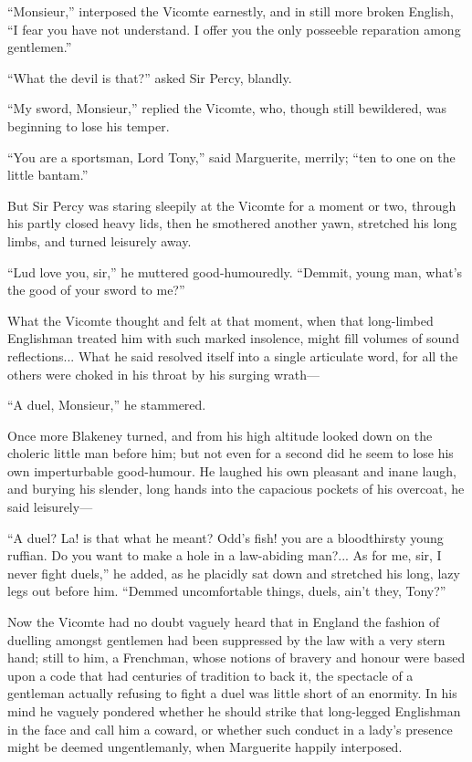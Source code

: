 \documentclass[paper=a5,BCOR=7mm,twoside,DIV=calc,12pt,usegeometry,chapterprefix,endperiod,headings=big]{scrbook}
\begin{document}
\enquote{Monsieur,} interposed the Vicomte earnestly, and in still more broken English, \enquote{I fear you have not understand. I offer you the only posseeble reparation among gentlemen.}

\enquote{What the devil is that?} asked Sir Percy, blandly.

\enquote{My sword, Monsieur,} replied the Vicomte, who, though still bewildered, was beginning to lose his temper.

\enquote{You are a sportsman, Lord Tony,} said Marguerite, merrily; \enquote{ten to one on the little bantam.}

But Sir Percy was staring sleepily at the Vicomte for a moment or two, through his partly closed heavy lids, then he smothered another yawn, stretched his long limbs, and turned leisurely away.

\enquote{Lud love you, sir,} he muttered good-humouredly. \enquote{Demmit, young man, what's the good of your sword to me?}

What the Vicomte thought and felt at that moment, when that long-limbed Englishman treated him with such marked insolence, might fill volumes of sound reflections... What he said resolved itself into a single articulate word, for all the others were choked in his throat by his surging wrath---

\enquote{A duel, Monsieur,} he stammered.

Once more Blakeney turned, and from his high altitude looked down on the choleric little man before him; but not even for a second did he seem to lose his own imperturbable good-humour. He laughed his own pleasant and inane laugh, and burying his slender, long hands into the capacious pockets of his overcoat, he said leisurely---

\enquote{A duel? La! is that what he meant? Odd's fish! you are a bloodthirsty young ruffian. Do you want to make a hole in a law-abiding man?... As for me, sir, I never fight duels,} he added, as he placidly sat down and stretched his long, lazy legs out before him. \enquote{Demmed uncomfortable things, duels, ain't they, Tony?}

Now the Vicomte had no doubt vaguely heard that in England the fashion of duelling amongst gentlemen had been suppressed by the law with a very stern hand; still to him, a Frenchman, whose notions of bravery and honour were based upon a code that had centuries of tradition to back it, the spectacle of a gentleman actually refusing to fight a duel was little short of an enormity. In his mind he vaguely pondered whether he should strike that long-legged Englishman in the face and call him a coward, or whether such conduct in a lady's presence might be deemed ungentlemanly, when Marguerite happily interposed.
\end{document}
